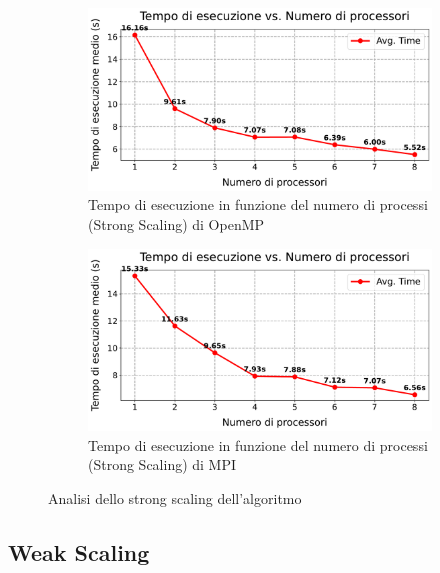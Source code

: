 \documentclass[letterpaper,11pt,leqno]{article}
\begin{document}
\begin{figure}[h]
    \centering
    \begin{subfigure}{0.48\textwidth} %
        \centering
        \includegraphics[scale=0.3]{graphs/omp_strong_scaling.pdf}
        \caption{Tempo di esecuzione in funzione del numero di processi (Strong Scaling) di OpenMP}
        \label{f:strong_scaling}
    \end{subfigure}
    \hfill %
    \begin{subfigure}{0.48\textwidth} %
        \centering
        \includegraphics[scale=0.3]{graphs/mpi_strong_scaling.pdf}
        \caption{Tempo di esecuzione in funzione del numero di processi (Strong Scaling) di MPI}
        \label{f:strong_scaling_speedup}
    \end{subfigure}
    \caption{Analisi dello strong scaling dell'algoritmo}
    \label{f:strong_scaling_graphs}
\end{figure}
  


\subsection{Weak Scaling}
\end{document}

